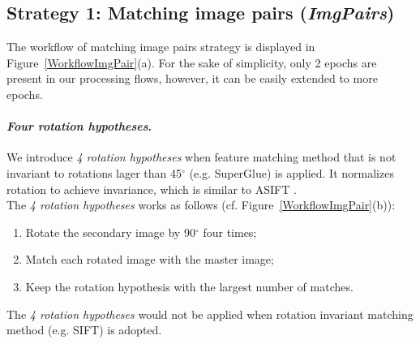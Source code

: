 \subsection{Strategy 1: Matching image pairs (\textit{ImgPairs})}
The workflow of matching image pairs strategy is displayed in Figure~\ref{WorkflowImgPair}(a). For the sake of simplicity, only 2 epochs are present in our processing flows, however, it can be easily extended to more epochs.\\
\paragraph{\textit{Four rotation hypotheses}.} We introduce \textit{4 rotation hypotheses} when feature matching method that is not invariant to rotations lager than 45$^\circ$ (e.g. SuperGlue) is applied. 
It normalizes rotation to achieve invariance, which is similar to ASIFT \cite{morel2009asift}.\\
The \textit{4 rotation hypotheses} works as follows (cf. Figure~\ref{WorkflowImgPair}(b)): 
\begin{enumerate}
    \item Rotate the secondary image by 90$^{\circ}$ four times;
    \item Match each rotated image with the master image;
    \item Keep the rotation hypothesis with the largest number of matches.
\end{enumerate}
The \textit{4 rotation hypotheses} would not be applied when rotation invariant matching method (e.g. SIFT) is adopted.
\par
